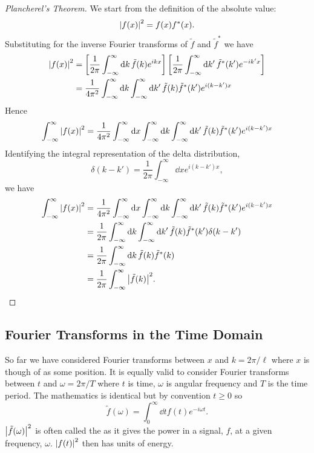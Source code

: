 \documentclass[a4paper]{article}
\begin{document}
    \begin{proof}[Plancherel's Theorem]
        We start from the definition of the absolute value:
        \[\abs{f(x)}^2 = f(x)f^*(x).\]
        Substituting for the inverse Fourier transforms of \(\tilde{f}\) and \(\tilde{f}^*\) we have
        \begin{align*}
            \abs{f(x)}^2 &= \left[\frac{1}{2\pi} \int_{-\infty}^{\infty}  \dd{k} \tilde{f}(k) e^{ikx}\right] \left[\frac{1}{2\pi} \int_{-\infty}^{\infty} \dd{k'} \tilde f^*(k') e^{-ik'x}\right]\\
            &= \frac{1}{4\pi^2} \int_{-\infty}^{\infty} \dd{k} \int_{-\infty}^{\infty} \dd{k'} \tilde{f}(k)\tilde{f}^*(k') e^{i(k - k')x}
        \end{align*}
        Hence
        \[\int_{-\infty}^{\infty} \abs{f(x)}^2 = \frac{1}{4\pi^2} \int_{-\infty}^{\infty} \dd{x} \int_{-\infty}^{\infty} \dd{k} \int_{-\infty}^{\infty} \dd{k'} \tilde{f}(k)\tilde{f}^*(k') e^{i(k - k')x}\]
        Identifying the integral representation of the delta distribution,
        \[\delta(k - k') = \frac{1}{2\pi} \int_{-\infty}^{\infty} \dd{x} e^{i(k - k')x},\]
        we have
        \begin{align*}
            \int_{-\infty}^{\infty} \abs{f(x)}^2 &= \frac{1}{4\pi^2} \int_{-\infty}^{\infty} \dd{x} \int_{-\infty}^{\infty} \dd{k} \int_{-\infty}^{\infty} \dd{k'} \tilde{f}(k)\tilde{f}^*(k') e^{i(k - k')x}\\
            &= \frac{1}{2\pi} \int_{-\infty}^{\infty} \dd{k} \int_{-\infty}^{\infty} \dd{k'} \tilde{f}(k)\tilde{f}^*(k') \delta(k - k')\\
            &= \frac{1}{2\pi} \int_{-\infty}^{\infty} \dd{k} \tilde{f}(k)\tilde{f}^*(k)\\
            &= \frac{1}{2\pi} \int_{-\infty}^{\infty} \abs{\tilde{f}(k)}^2.
        \end{align*}
    \end{proof}

    \subsection{Fourier Transforms in the Time Domain}
    So far we have considered Fourier transforms between \(x\) and \(k = 2\pi/\ell\) where \(x\) is though of as some position.
    It is equally valid to consider Fourier transforms between \(t\) and \(\omega = 2\pi/T\) where \(t\) is time, \(\omega\) is angular frequency and \(T\) is the time period.
    The mathematics is identical but by convention \(t \ge 0\) so
    \[\tilde{f}(\omega) = \int_{0}^{\infty} \dd{t} f(t) e^{-i\omega t}.\]
    \(\abs{\tilde{f}(\omega)}^2\) is often called the  as it gives the power in a signal, \(f\), at a given frequency, \(\omega\).
    \(\abs{f(t)}^2\) then has units of energy.
    
\end{document}
